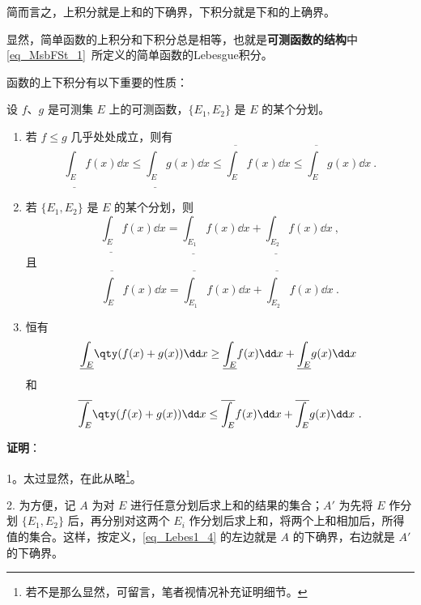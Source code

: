 简而言之，上积分就是上和的下确界，下积分就是下和的上确界。

显然，简单函数的上积分和下积分总是相等，也就是\textbf{可测函数的结构}中\autoref{eq_MsbFSt_1}~所定义的简单函数的Lebesgue积分。

函数的上下积分有以下重要的性质：

\begin{theorem}{}\label{the_Lebes1_1}

设 $f$、$g$ 是可测集 $E$ 上的可测函数，$\{E_1, E_2\}$ 是 $E$ 的某个分划。

\begin{enumerate}
  \item 若 $f\leq g$ 几乎处处成立，则有
  \begin{equation}
  \underline{\int_E} f(x) \dd x \leq \underline{\int_E} g(x) \dd x \leq \overline{\int_E} f(x) \dd x \leq \overline{\int_E} g(x) \dd x~.
  \end{equation}
  \item 若 $\{E_1, E_2\}$ 是 $E$ 的某个分划，则
  \begin{equation}\label{eq_Lebes1_1}
  \underline{\int_E} f(x) \dd x=\underline{\int_{E_1}} f(x) \dd x+\underline{\int_{E_2}} f(x) \dd x~,
  \end{equation}
  且
  \begin{equation}\label{eq_Lebes1_4}
  \overline{\int_E} f(x) \dd x=\overline{\int_{E_1}} f(x) \dd x+\overline{\int_{E_2}} f(x) \dd x~.
  \end{equation}
  \item 恒有
  \begin{equation}\label{eq_Lebes1_5}
  \underline{\int_E} \qty(f(x)+g(x)) \dd x \geq \underline{\int_E} f(x) \dd x+\underline{\int_E} g(x) \dd x~
  \end{equation}
  和
  \begin{equation}\label{eq_Lebes1_6}
  \overline{\int_E} \qty(f(x)+g(x)) \dd x \leq \overline{\int_E} f(x) \dd x+\overline{\int_E} g(x) \dd x~.
  \end{equation}
\end{enumerate}



\end{theorem}

\textbf{证明}：

1。太过显然，在此从略\footnote{若不是那么显然，可留言，笔者视情况补充证明细节。}。

2. 为方便，记 $A$ 为对 $E$ 进行任意分划后求上和的结果的集合；$A'$ 为先将 $E$ 作分划 $\{E_1, E_2\}$ 后，再分别对这两个 $E_i$ 作分划后求上和，将两个上和相加后，所得值的集合。这样，按定义，\autoref{eq_Lebes1_4} 的左边就是 $A$ 的下确界，右边就是 $A'$ 的下确界。

